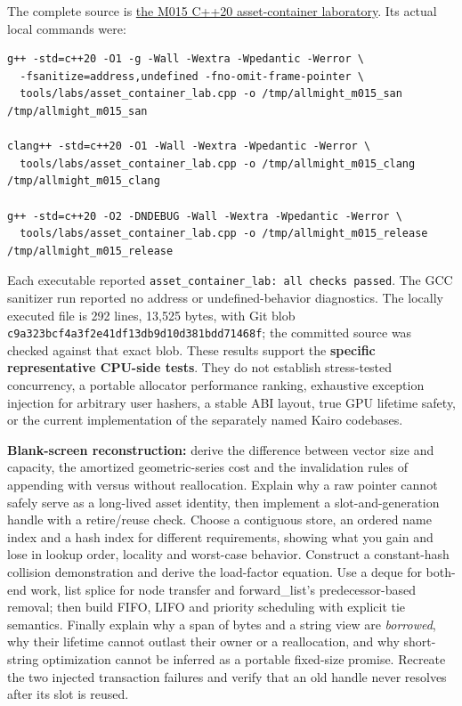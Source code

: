The complete source is \hyperref[source-file-e829cf731b17419e282775cf]{the M015 C++20 asset-container laboratory}. Its actual local commands were:

\begin{verbatim}
g++ -std=c++20 -O1 -g -Wall -Wextra -Wpedantic -Werror \
  -fsanitize=address,undefined -fno-omit-frame-pointer \
  tools/labs/asset_container_lab.cpp -o /tmp/allmight_m015_san
/tmp/allmight_m015_san

clang++ -std=c++20 -O1 -Wall -Wextra -Wpedantic -Werror \
  tools/labs/asset_container_lab.cpp -o /tmp/allmight_m015_clang
/tmp/allmight_m015_clang

g++ -std=c++20 -O2 -DNDEBUG -Wall -Wextra -Wpedantic -Werror \
  tools/labs/asset_container_lab.cpp -o /tmp/allmight_m015_release
/tmp/allmight_m015_release
\end{verbatim}

Each executable reported \texttt{asset\_container\_lab:\ all\ checks\ passed}. The GCC sanitizer run reported no address or undefined-behavior diagnostics. The locally executed file is 292 lines, 13,525 bytes, with Git blob \texttt{c9a323bcf4a3f2e41df13db9d10d381bdd71468f}; the committed source was checked against that exact blob. These results support the \textbf{specific representative CPU-side tests}. They do not establish stress-tested concurrency, a portable allocator performance ranking, exhaustive exception injection for arbitrary user hashers, a stable ABI layout, true GPU lifetime safety, or the current implementation of the separately named Kairo codebases.

\textbf{Blank-screen reconstruction:} derive the difference between vector size and capacity, the amortized geometric-series cost and the invalidation rules of appending with versus without reallocation. Explain why a raw pointer cannot safely serve as a long-lived asset identity, then implement a slot-and-generation handle with a retire/reuse check. Choose a contiguous store, an ordered name index and a hash index for different requirements, showing what you gain and lose in lookup order, locality and worst-case behavior. Construct a constant-hash collision demonstration and derive the load-factor equation. Use a deque for both-end work, list splice for node transfer and forward\_list's predecessor-based removal; then build FIFO, LIFO and priority scheduling with explicit tie semantics. Finally explain why a span of bytes and a string view are \emph{borrowed}, why their lifetime cannot outlast their owner or a reallocation, and why short-string optimization cannot be inferred as a portable fixed-size promise. Recreate the two injected transaction failures and verify that an old handle never resolves after its slot is reused.

